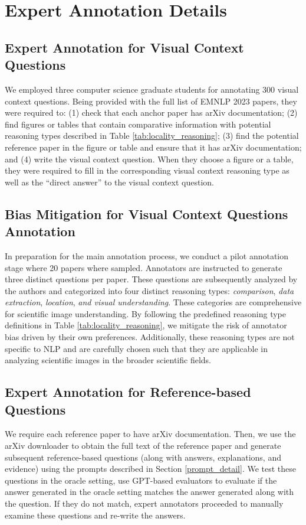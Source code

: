 \section{Expert Annotation Details}
\label{sec:expert_annotation_details}
\subsection{Expert Annotation for Visual Context Questions}
We employed three computer science graduate students for annotating 300 visual context questions. Being provided with the full list of EMNLP 2023 papers, they were required to: (1) check that each anchor paper has arXiv documentation; (2) find figures or tables that contain comparative information with potential reasoning types described in Table \ref{tab:locality_reasoning}; (3) find the potential reference paper in the figure or table and ensure that it has arXiv documentation; and (4) write the visual context question. When they choose a figure or a table, they were required to fill in the corresponding visual context reasoning type as well as the ``direct answer'' to the visual context question. 

\subsection{Bias Mitigation for Visual Context Questions Annotation}
In preparation for the main annotation process, we conduct a pilot annotation stage where 20 papers where sampled. 
Annotators are instructed to generate three distinct questions per paper.  
These questions are subsequently analyzed by the authors and categorized into four distinct reasoning types: \emph{comparison}, \emph{data extraction}, \emph{location}, \emph{and visual understanding}.
These categories are comprehensive for scientific image understanding. 
By following the predefined reasoning type definitions in Table \ref{tab:locality_reasoning}, we mitigate the risk of annotator bias driven by their own preferences. 
Additionally, these reasoning types are not specific to NLP and are carefully chosen such that they are applicable in analyzing scientific images in the broader scientific fields. 

\subsection{Expert Annotation for Reference-based Questions}
We require each reference paper to have arXiv documentation. Then, we use the arXiv downloader to obtain the full text of the reference paper and generate subsequent reference-based questions (along with answers, explanations, and evidence) using the prompts described in Section \ref{prompt_detail}. We test these questions in the oracle setting, use GPT-based evaluators to evaluate if the answer generated in the oracle setting matches the answer generated along with the question. If they do not match, expert annotators proceeded to manually examine these questions and re-write the answers.

